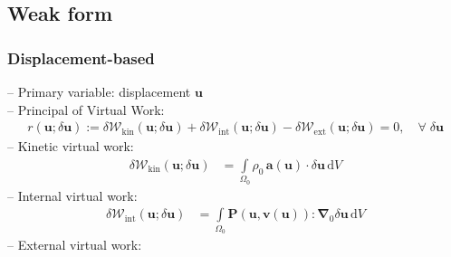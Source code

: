 \documentclass[a4paper,12pt]{report}
\newcommand{\bs}[1]{\boldsymbol{#1}}
\newcommand{\Om}{\mathit{\Omega}}
\begin{document}
\subsection{Weak form}

\subsubsection{Displacement-based}
-- Primary variable: displacement $\bs{u}$\\

-- Principal of Virtual Work:
\begin{align}
r(\bs{u};\delta\bs{u}) := \delta \mathcal{W}_{\mathrm{kin}}(\bs{u};\delta\bs{u}) + \delta \mathcal{W}_{\mathrm{int}}(\bs{u};\delta\bs{u}) - \delta \mathcal{W}_{\mathrm{ext}}(\bs{u};\delta\bs{u}) = 0, \quad \forall \; \delta\bs{u}\label{eq:res_u_solid}
\end{align}
-- Kinetic virtual work:
\begin{align}
\delta \mathcal{W}_{\mathrm{kin}}(\bs{u};\delta\bs{u}) &= \int\limits_{\Om_{0}} \rho_{0}\,\bs{a}(\bs{u}) \cdot \delta\bs{u} \,\mathrm{d}V \label{eq:deltaWkin}
\end{align}
-- Internal virtual work:
\begin{align}
\delta \mathcal{W}_{\mathrm{int}}(\bs{u};\delta\bs{u}) &= \int\limits_{\Om_{0}} \bs{P}(\bs{u},\bs{v}(\bs{u})) : \bs{\nabla}_{0} \delta\bs{u} \,\mathrm{d}V \label{eq:deltaWint}
\end{align}
-- External virtual work:\\
\end{document}
